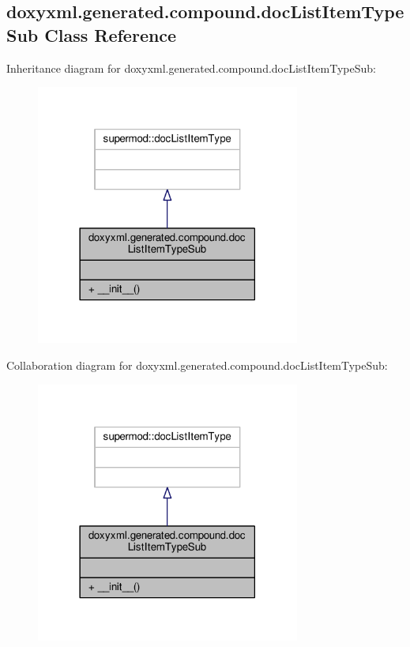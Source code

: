 \subsection{doxyxml.\+generated.\+compound.\+doc\+List\+Item\+Type\+Sub Class Reference}
\label{classdoxyxml_1_1generated_1_1compound_1_1docListItemTypeSub}


Inheritance diagram for doxyxml.\+generated.\+compound.\+doc\+List\+Item\+Type\+Sub\+:
\nopagebreak
\begin{figure}[H]
\begin{center}
\leavevmode
\includegraphics[width=246pt]{df/d7e/classdoxyxml_1_1generated_1_1compound_1_1docListItemTypeSub__inherit__graph}
\end{center}
\end{figure}


Collaboration diagram for doxyxml.\+generated.\+compound.\+doc\+List\+Item\+Type\+Sub\+:
\nopagebreak
\begin{figure}[H]
\begin{center}
\leavevmode
\includegraphics[width=246pt]{d6/d44/classdoxyxml_1_1generated_1_1compound_1_1docListItemTypeSub__coll__graph}
\end{center}
\end{figure}
